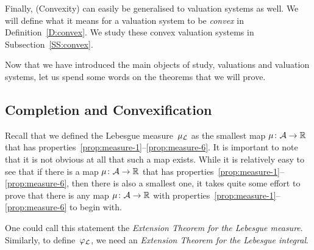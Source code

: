 Finally,
(Convexity)
can easily be generalised to valuation systems as well.
We will define what it means
for a valuation system to be \emph{convex}
in  Definition~\ref{D:convex}.
We study these convex valuation systems in Subsection~\ref{SS:convex}.

\vspace{1em}
\noindent
Now that we have introduced
the main objects of study,
valuations and valuation systems,
let us spend some words on the theorems that we will prove.


\subsection{Completion and Convexification}
Recall that we defined
the Lebesgue measure~$\mu_{\mathcal{L}}$
as the smallest map $\mu\colon \mathcal{A}\rightarrow \mathbb{R}$
that has properties~\ref{prop:measure-1}--\ref{prop:measure-6}.
It is important to note that
it is not obvious at all that such a map exists.
While it is relatively easy to see
that if there is a map $\mu\colon \mathcal{A} \rightarrow \mathbb{R}$
that has properties~\ref{prop:measure-1}--\ref{prop:measure-6},
then there is also a smallest one,
it takes quite some effort
to prove that there is any map $\mu\colon \mathcal{A}\rightarrow \mathbb{R}$
with properties~\ref{prop:measure-1}--\ref{prop:measure-6} to begin with.

One could call this statement the \emph{Extension Theorem
for the Lebesgue measure}.
Similarly,
to define~$\varphi_{\mathcal{L}}$,
we need an \emph{Extension Theorem
for the Lebesgue integral}.

